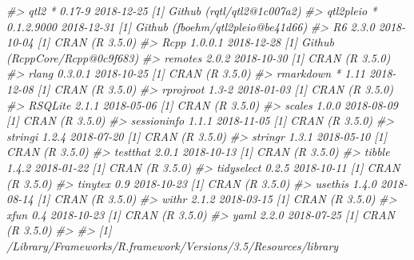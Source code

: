\documentclass{book}
\newenvironment{Shaded}{\begin{snugshade}}{\end{snugshade}}
\newcommand{\CommentTok}[1]{\textcolor[rgb]{0.56,0.35,0.01}{\textit{#1}}}
\begin{document}
\begin{Shaded}
\begin{Highlighting}[]
\CommentTok{#>  qtl2        * 0.17-9     2018-12-25 [1] Github (rqtl/qtl2@1c007a2)       }
\CommentTok{#>  qtl2pleio   * 0.1.2.9000 2018-12-31 [1] Github (fboehm/qtl2pleio@be41d66)}
\CommentTok{#>  R6            2.3.0      2018-10-04 [1] CRAN (R 3.5.0)                   }
\CommentTok{#>  Rcpp          1.0.0.1    2018-12-28 [1] Github (RcppCore/Rcpp@0c9f683)   }
\CommentTok{#>  remotes       2.0.2      2018-10-30 [1] CRAN (R 3.5.0)                   }
\CommentTok{#>  rlang         0.3.0.1    2018-10-25 [1] CRAN (R 3.5.0)                   }
\CommentTok{#>  rmarkdown   * 1.11       2018-12-08 [1] CRAN (R 3.5.0)                   }
\CommentTok{#>  rprojroot     1.3-2      2018-01-03 [1] CRAN (R 3.5.0)                   }
\CommentTok{#>  RSQLite       2.1.1      2018-05-06 [1] CRAN (R 3.5.0)                   }
\CommentTok{#>  scales        1.0.0      2018-08-09 [1] CRAN (R 3.5.0)                   }
\CommentTok{#>  sessioninfo   1.1.1      2018-11-05 [1] CRAN (R 3.5.0)                   }
\CommentTok{#>  stringi       1.2.4      2018-07-20 [1] CRAN (R 3.5.0)                   }
\CommentTok{#>  stringr       1.3.1      2018-05-10 [1] CRAN (R 3.5.0)                   }
\CommentTok{#>  testthat      2.0.1      2018-10-13 [1] CRAN (R 3.5.0)                   }
\CommentTok{#>  tibble        1.4.2      2018-01-22 [1] CRAN (R 3.5.0)                   }
\CommentTok{#>  tidyselect    0.2.5      2018-10-11 [1] CRAN (R 3.5.0)                   }
\CommentTok{#>  tinytex       0.9        2018-10-23 [1] CRAN (R 3.5.0)                   }
\CommentTok{#>  usethis       1.4.0      2018-08-14 [1] CRAN (R 3.5.0)                   }
\CommentTok{#>  withr         2.1.2      2018-03-15 [1] CRAN (R 3.5.0)                   }
\CommentTok{#>  xfun          0.4        2018-10-23 [1] CRAN (R 3.5.0)                   }
\CommentTok{#>  yaml          2.2.0      2018-07-25 [1] CRAN (R 3.5.0)                   }
\CommentTok{#> }
\CommentTok{#> [1] /Library/Frameworks/R.framework/Versions/3.5/Resources/library}
\end{Highlighting}
\end{Shaded}



\printbibliography

\newpage
\appendix

\renewcommand{\thetable}{\textbf{S\arabic{table}}}
\setcounter{table}{0}
\end{document}
